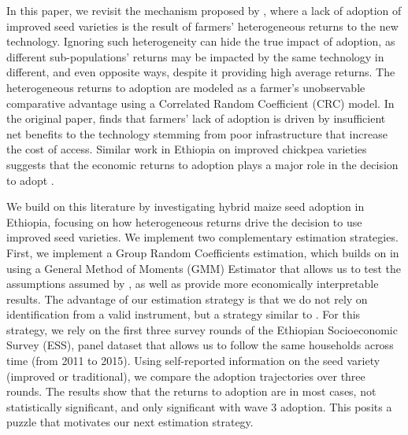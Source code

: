 \documentclass[11pt]{article}
\begin{document}
In this paper, we revisit the mechanism proposed by \citep{Suri2011-oi}, where a lack of adoption of improved seed varieties is the result of farmers' heterogeneous returns to the new technology. Ignoring such heterogeneity can hide the true impact of adoption, as different sub-populations' returns may be impacted by the same technology in different, and even opposite ways, despite it providing high average returns. The heterogeneous returns to adoption are modeled as a farmer's unobservable comparative advantage using a Correlated Random Coefficient (CRC) model. In the original paper, \citep{Suri2011-oi} finds that farmers’ lack of adoption is driven by insufficient net benefits to the technology stemming from poor infrastructure that increase the cost of access. Similar work in Ethiopia on improved chickpea varieties suggests that the economic returns to adoption plays a major role in the decision to adopt \citep{Michler2018-wk}. 

We build on this literature by investigating hybrid maize seed adoption in Ethiopia, focusing on how heterogeneous returns drive the decision to use improved seed varieties. We implement two complementary estimation strategies. First, we implement a Group Random Coefficients estimation, which builds on \cite{Suri2011-oi} in \cite{Tjernstrom_Emilia_Dalia_Ghanem_Oscar_Barriga_Cabanillas_Travis_J_Lybbert_Jeffrey_D_Michler_and_Aleksandr_Michuda2020-bc} using a General Method of Moments (GMM) Estimator that allows us to test the assumptions assumed by \cite{Suri2011-oi}, as well as provide more economically interpretable results. The advantage of our estimation strategy is that we do not rely on identification from a valid instrument, but a strategy similar to \cite{Chamberlain1984-uk}. For this strategy, we rely on the first three survey rounds of the Ethiopian Socioeconomic Survey (ESS), panel dataset that allows us to follow the same households across time (from 2011 to 2015). Using self-reported information on the seed variety (improved or traditional), we compare the adoption trajectories over three rounds. The results show that the returns to adoption are in most cases, not statistically significant, and only significant with wave 3 adoption. This posits a puzzle that motivates our next estimation strategy.
\end{document}
